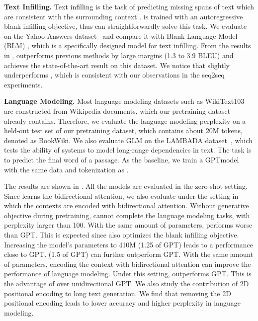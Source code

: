  
\textbf{Text Infilling.}
Text infilling is the task of predicting missing spans of text which are consistent with the surrounding context \cite{TextInfill2019,Fillin2020,BLM2020}. \model is trained with an autoregressive blank infilling objective, thus can straightforwardly solve this task. We evaluate \model on the Yahoo Answers dataset~\cite{YahooAnswers} and compare it with Blank Language Model (BLM) \cite{BLM2020}, which is a specifically designed model for text infilling. From the results in , \model outperforms previous methods by large margins (1.3 to 3.9 BLEU) and achieves the state-of-the-art result on this dataset. We notice that \modelx\largemulti slightly underperforms \modelx\largem, which is consistent with our observations in the seq2seq experiments.








 
\textbf{Language Modeling.}
Most language modeling datasets such as WikiText103 are constructed from Wikipedia documents, which our pretraining dataset already contains.
Therefore, we evaluate the language modeling perplexity on a held-out test set of our pretraining dataset, which contains about 20M tokens, denoted as BookWiki. We also evaluate GLM on the LAMBADA dataset~\cite{LAMBADADataset2016}, which tests the ability of systems to model long-range dependencies in text. The task is to predict the final word of a passage. As the baseline, we train a GPT\largem model~\cite{GPT2-2018,GPT3-2020} with the same data and tokenization as \modelx\largem. 

The results are shown in . All the models are evaluated in the zero-shot setting. Since \model learns the bidirectional attention, we also evaluate \model under the setting in which the contexts are encoded with bidirectional attention. Without generative objective during pretraining, \modelx\largem cannot complete the language modeling tasks, with perplexity larger than 100. With the same amount of parameters, \modelx\largemulti performs worse than GPT\largem. This is expected since \docmodel also optimizes the blank infilling objective. Increasing the model's parameters to 410M (1.25 of GPT\largem) leads to a performance close to GPT\largem. \modelx (1.5 of GPT\largem) can further outperform GPT\largem. With the same amount of parameters, encoding the context with bidirectional attention can improve the performance of language modeling. Under this setting, \modelx outperforms GPT\largem. This is the advantage of \model over unidirectional GPT. We also study the contribution of 2D positional encoding to long text generation. We find that removing the 2D positional encoding leads to lower accuracy and higher perplexity in language modeling.




